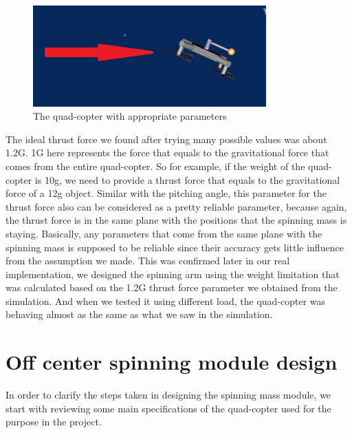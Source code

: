 \begin{figure}[h]
\centering
\includegraphics[width=0.8\textwidth]{./Lin_img/10.jpg}
\caption{The quad-copter with appropriate parameters}
\end{figure}
\newline
The ideal thrust force we found after trying many possible values was about 1.2G. 1G here represents the force that equals to the gravitational force that comes from the entire quad-copter. So for example, if the weight of the quad-copter is 10g, we need to provide a thrust force that equals to the gravitational force of a 12g object.
\newline
\newline
Similar with the pitching angle, this parameter for the thrust force also can be considered as a pretty reliable parameter, because again, the thrust force is in the same plane with the positions that the spinning mass is staying. Basically, any parameters that come from the same plane with the spinning mass is supposed to be reliable since their accuracy gets little influence from the assumption we made.
\newline
\newline
This was confirmed later in our real implementation, we designed the spinning arm using the weight limitation that was calculated based on the 1.2G thrust force parameter we obtained from the simulation. And when we tested it using different load, the quad-copter was behaving almost as the same as what we saw in the simulation. 
\section{Off center spinning module design}
In order to clarify the steps taken in designing the spinning mass module, we start with reviewing some main specifications of the quad-copter used for the purpose in the project.
